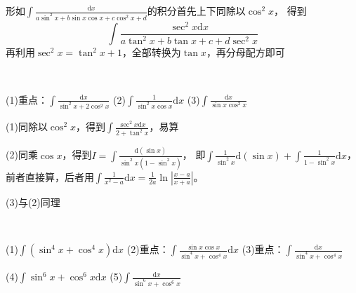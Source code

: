 \begin{theorem}
  形如$\int \frac{\mathrm{d} x}{a \sin^2 x + b \sin x\cos x + c \cos^2 x + d}$的积分首先上下同除以$\cos^2 x$，
  得到
  \begin{equation*}
    \int \frac{\sec^2 x \mathrm{d} x}{a \tan^2 x + b\tan x + c + d \sec^2 x}
  \end{equation*}
  再利用$\sec^2 x = \tan^2 x + 1$，全部转换为$\tan x$，再分母配方即可
\end{theorem}

~


\begin{exercise}
  (1)重点：$\int \frac{\mathrm{d} x}{\sin^2 x + 2 \cos ^2 x}$
  (2)$\int \frac{1}{\sin^2 x \cos x}\mathrm{d} x$
  (3)$\int \frac{\mathrm{d} x}{\sin x \cos^2 x}$
\end{exercise}

\begin{solution}
  (1)同除以$\cos^2 x$，得到$\int \frac{\sec^2 x \mathrm{d} x}{2 + \tan^2 x}$，易算

  (2)同乘$\cos x$，得到$I = \int \frac{\mathrm{d}(\sin x)}{\sin^2x (1 - \sin^2 x)}$，
  即$\int \frac{1}{\sin^2 x}\mathrm{d} (\sin x) + \int \frac{1}{1 - \sin^2 x}\mathrm{d} x$，
  前者直接算，后者用$\int \frac{1}{x^2 - a}\mathrm{d} x = \frac{1}{2a} \ln \left| \frac{x-a}{x+a} \right|$。

  (3)与(2)同理
\end{solution}
~


\begin{exercise}
  (1)$\int (\sin^4 x  + \cos^4 x)\mathrm{d} x$
  (2)重点：$\int \frac{\sin x \cos x}{\sin^4 x + \cos^4 x}\mathrm{d} x$
  (3)重点：$\int \frac{\mathrm{d} x}{\sin^4x + \cos^4 x}$

  (4)$\int \sin^6 x + \cos^6 x \mathrm{d} x$
  (5)$\int \frac{\mathrm{d} x}{\sin^6 x + \cos^6 x}$
\end{exercise}

